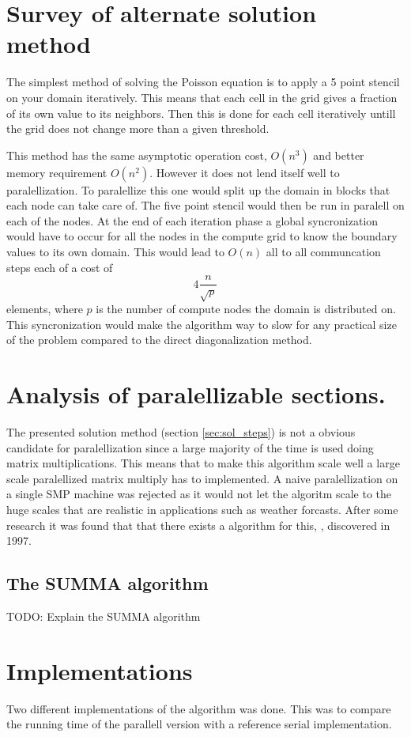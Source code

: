 \documentclass{article}
\begin{document}
\section{Survey of alternate solution method}
The simplest method of solving the Poisson equation is to apply a 5 point stencil on your domain
iteratively. This means that each cell in the grid gives a fraction of its own value to its neighbors.
Then this is done for each cell iteratively untill the grid does not change more than a given threshold.

This method has the same asymptotic operation cost, $O(n^3)$ and better memory requirement $O(n^2)$.
However it does not lend itself well to paralellization. To paralellize this one would split
up the domain in blocks that each node can take care of. The five point stencil would then be
run in paralell on each of the nodes. At the end of each iteration phase a global
syncronization would have to occur for all the nodes in the compute grid to know the boundary values
to its own domain. This would lead to $O(n)$ all to all communcation steps each of a cost of
\[
4\frac{n}{\sqrt{p}}
\]
elements, where $p$ is the number of compute nodes the domain is distributed on.
This syncronization would make the algorithm way to slow for any practical size
of the problem compared to the direct diagonalization method.

\section{Analysis of paralellizable sections.}
The presented solution method (section \ref{sec:sol_steps}) is not a obvious candidate for paralellization
since a large majority of the time is used doing matrix multiplications.
This means that to make this algorithm scale well a large scale paralellized
matrix multiply has to implemented. A naive paralellization on a single SMP machine
was rejected as it would not let the algoritm scale to the huge scales that are realistic
in applications such as weather forcasts.
After some research it was found that that there exists a algorithm for this, \cite{summa}, discovered in 1997.

\subsection{The SUMMA algorithm}
TODO: Explain the SUMMA algorithm

\section{Implementations}
Two different implementations of the algorithm was done.
This was to compare the running time of the parallell version with a reference
serial implementation.
\end{document}
